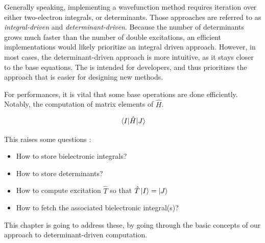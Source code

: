 \documentclass[./thesis.tex]{subfiles}
\begin{document}
\label{chap:DET_DRIVEN}

Generally speaking, implementing a wavefunction method requires iteration over either two-electron integrals, or determinants. Those approaches are referred to as \emph{integral-driven} and \emph{determinant-driven}. Because the number of determinants grows much faster than the number of double excitations, an efficient implementations would likely prioritize an integral driven approach. However, in most cases, the determinant-driven approach is more intuitive, as it stays closer to the base equations. The \QP is intended for developers, and thus prioritizes the approach that is easier for designing new methods.

For performances, it is vital that some base operations are done efficiently. Notably, the computation of matrix elements of $\hat H$.

\begin{equation}
\mel{I}{\hat{H}}{J}
\end{equation}

This raises some questions :

\begin{itemize}
\item
How to store bielectronic integrals?
\item
How to store determinants?
\item
How to compute excitation $\hat T$ so that $\hat T \ket I = \ket J$
\item
How to fetch the associated bielectronic integral(s)?
\end{itemize}

This chapter is going to address these, by going through the basic concepts of our approach to determinant-driven computation.
\end{document}

